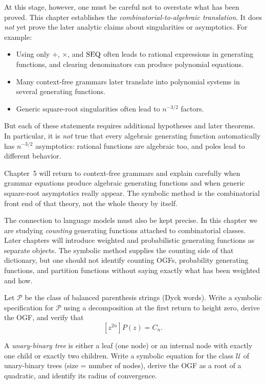 At this stage, however, one must be careful not to overstate what has been proved. This chapter establishes the \emph{combinatorial-to-algebraic translation}. It does \emph{not} yet prove the later analytic claims about singularities or asymptotics. For example:
\begin{itemize}
  \item Using only $+$, $\times$, and $\operatorname{SEQ}$ often leads to rational expressions in generating functions, and clearing denominators can produce polynomial equations.
  \item Many context-free grammars later translate into polynomial systems in several generating functions.
  \item Generic square-root singularities often lead to $n^{-3/2}$ factors.
\end{itemize}
But each of these statements requires additional hypotheses and later theorems. In particular, it is \emph{not} true that every algebraic generating function automatically has $n^{-3/2}$ asymptotics: rational functions are algebraic too, and poles lead to different behavior.

Chapter~5 will return to context-free grammars and explain carefully when grammar equations produce algebraic generating functions and when generic square-root asymptotics really appear. The symbolic method is the combinatorial front end of that theory, not the whole theory by itself.

The connection to language models must also be kept precise. In this chapter we are studying \emph{counting} generating functions attached to combinatorial classes. Later chapters will introduce weighted and probabilistic generating functions as separate objects. The symbolic method supplies the counting side of that dictionary, but one should not identify counting OGFs, probability generating functions, and partition functions without saying exactly what has been weighted and how.

\begin{exercise}
Let $\mathcal{P}$ be the class of balanced parenthesis strings (Dyck words). Write a symbolic specification for $\mathcal{P}$ using a decomposition at the first return to height zero, derive the OGF, and verify that
\[
  [z^{2n}]P(z) = C_n.
\]
\end{exercise}

\begin{exercise}
A \emph{unary-binary tree} is either a leaf (one node) or an internal node with exactly one child or exactly two children. Write a symbolic equation for the class $\mathcal{U}$ of unary-binary trees (size = number of nodes), derive the OGF as a root of a quadratic, and identify its radius of convergence.
\end{exercise}

